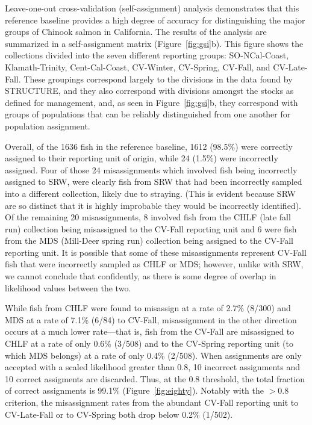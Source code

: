 Leave-one-out cross-validation (self-assignment) analysis demonstrates that this
reference baseline provides a high degree of accuracy for distinguishing the major
groups of Chinook salmon in California.  The results of the analysis are summarized
in a self-assignment matrix (Figure~\ref{fig:gsi}b).
This figure shows the collections divided into the seven different reporting groups:
SO-NCal-Coast,  Klamath-Trinity, Cent-Cal-Coast,
CV-Winter, CV-Spring, CV-Fall, and  CV-Late-Fall.  These groupings correspond
largely to the divisions in the data found by STRUCTURE, and they also correspond
with divisions amongst the stocks as defined for management, and, as seen in
Figure~\ref{fig:gsi}b, they correspond with groups of populations that can be reliably distinguished
from one another for population assignment.

Overall, of the 1636 fish in the reference baseline, 1612 (98.5\%) were correctly
assigned to their reporting unit of origin, while 24 (1.5\%) were incorrectly assigned.
Four of those 24 misassignments which involved fish being incorrectly assigned to
SRW, were clearly fish from SRW that had been incorrectly sampled into a different
collection, likely due to straying. (This is evident because SRW are so distinct that it is highly improbable they
would be incorrectly identified).  Of the remaining 20 misassignments,  8 involved fish from the
CHLF (late fall run) collection being misassigned to the CV-Fall reporting unit and 6 were
fish from the MDS (Mill-Deer spring run) collection being assigned to the CV-Fall reporting unit.
It is possible that some of these misassignments represent CV-Fall fish that were incorrectly
sampled as CHLF or MDS; however, unlike with SRW,  we  cannot conclude that
confidently, as there is some degree of overlap in likelihood values between the two.

While fish from CHLF were found to misassign at a rate of 2.7\% (8/300) and MDS at a rate
of 7.1\% (6/84) to CV-Fall, misassignment in the other direction occurs at a much lower
rate---that is, fish from the CV-Fall are misassigned to CHLF at a rate
of only 0.6\% (3/508) and to the CV-Spring reporting unit (to which MDS belongs) at a rate
of only 0.4\% (2/508).
When assignments are only accepted with a scaled likelihood greater than 0.8,
10 incorrect assignments and 10 correct assigments are discarded.  Thus,
at the 0.8 threshold, the total fraction of correct assignments is 99.1\% (Figure~\ref{fig:eighty}).
Notably with the $>$0.8 criterion, the misassignment rates from the abundant CV-Fall
reporting unit to CV-Late-Fall or to CV-Spring both drop below 0.2\% (1/502).  

